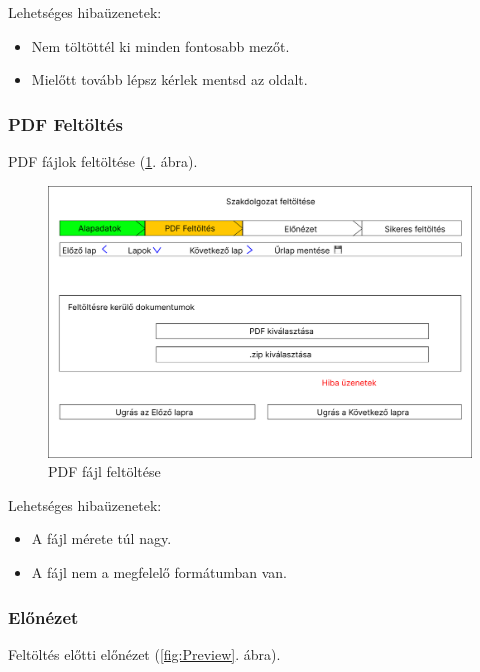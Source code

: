\documentclass[a4paper,12pt]{article}
\begin{document}
Lehetséges hibaüzenetek:
\begin{itemize}
	\item Nem töltöttél ki minden fontosabb mezőt.
	\item Mielőtt tovább lépsz kérlek mentsd az oldalt.
\end{itemize}

\subsubsection{PDF Feltöltés}

PDF fájlok feltöltése (\ref{fig:PDF_Upload}. ábra).

\begin{figure}[h!]
	\centering
	\includegraphics[width=\textwidth]{images/Web_pages/PDF_Upload.jpg}
	\caption{PDF fájl feltöltése}
	\label{fig:PDF_Upload}
\end{figure}

Lehetséges hibaüzenetek:
\begin{itemize}
	\item A fájl mérete túl nagy.
	\item A fájl nem a megfelelő formátumban van.
\end{itemize}

\subsubsection{Előnézet}

Feltöltés előtti előnézet (\ref{fig:Preview}. ábra).
\end{document}

